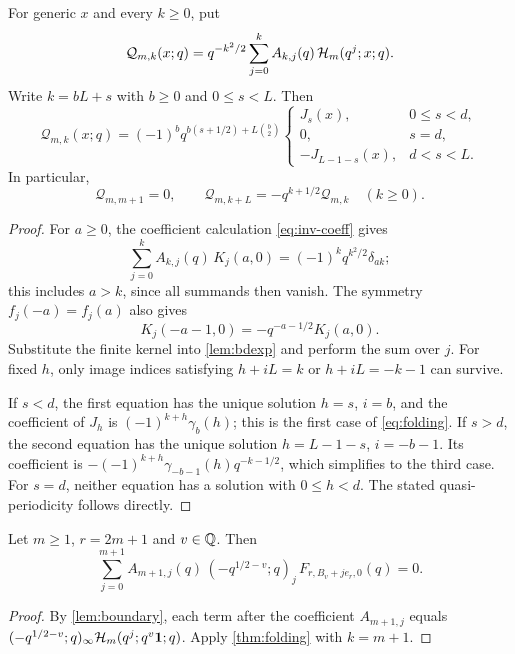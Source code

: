 \begin{theorem}\label{thm:folding}
For generic $x$ and every $k\ge0$, put
\[
\mathcal Q_{m,k}(x;q)=q^{-k^2/2}\sum_{j=0}^kA_{k,j}(q)\,\mathcal{H}_m(q^j;x;q).
\]
Write $k=bL+s$ with $b\ge0$ and $0\le s<L$. Then
\begin{equation}\label{eq:folding}
\mathcal Q_{m,k}(x;q)=(-1)^bq^{b(s+1/2)+L\binom b2}\begin{cases}J_s(x),&0\le s<d,\\ 0,&s=d,\\ -J_{L-1-s}(x),&d<s<L.\end{cases}
\end{equation}
In particular,
\[
\mathcal Q_{m,m+1}=0,\qquad \mathcal Q_{m,k+L}=-q^{k+1/2}\mathcal Q_{m,k}\quad(k\ge0).
\]
\end{theorem}

\begin{proof}
For $a\ge0$, the coefficient calculation \eqref{eq:inv-coeff} gives
\[
\sum_{j=0}^kA_{k,j}(q)\,K_j(a,0)=(-1)^kq^{k^2/2}\delta_{ak};
\]
this includes $a>k$, since all summands then vanish. The symmetry $f_j(-a)=f_j(a)$ also gives
\[
K_j(-a-1,0)=-q^{-a-1/2}K_j(a,0).
\]
Substitute the finite kernel into \cref{lem:bdexp} and perform the sum over $j$. For fixed $h$, only image indices satisfying $h+iL=k$ or $h+iL=-k-1$ can survive.

If $s<d$, the first equation has the unique solution $h=s$, $i=b$, and the coefficient of $J_h$ is $(-1)^{k+h}\gamma_b(h)$; this is the first case of \eqref{eq:folding}. If $s>d$, the second equation has the unique solution $h=L-1-s$, $i=-b-1$. Its coefficient is $-(-1)^{k+h}\gamma_{-b-1}(h)q^{-k-1/2}$, which simplifies to the third case. For $s=d$, neither equation has a solution with $0\le h<d$. The stated quasi-periodicity follows directly.
\end{proof}

\begin{corollary}\label{cor:bdrel}
Let $m\ge1$, $r=2m+1$ and $v\in\mathbb{Q}$. Then
\begin{equation}\label{eq:bdrel}
\sum_{j=0}^{m+1}A_{m+1,j}(q)\,(-q^{1/2-v};q)_j\,F_{r,B_v+je_r,0}(q)=0.
\end{equation}
\end{corollary}

\begin{proof}
By \cref{lem:boundary}, each term after the coefficient $A_{m+1,j}$ equals $(-q^{1/2-v};q)_\infty\mathcal{H}_m(q^j;q^v\mathbf{1};q)$. Apply \cref{thm:folding} with $k=m+1$.
\end{proof}

